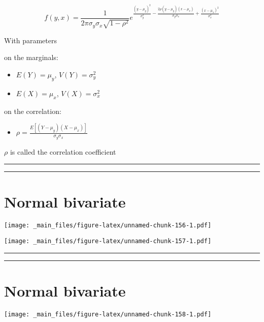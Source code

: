 \documentclass[
]{book}
\providecommand{\tightlist}{%
  \setlength{\itemsep}{0pt}\setlength{\parskip}{0pt}}
\begin{document}
\[f(y,x)=\frac{1}{2\pi \sigma_y\sigma_x \sqrt{1-\rho^2}}e^{\frac{(y-\mu_y)^2}{\sigma_y^2}-\frac{2\rho(y-\mu_y)(x-\mu_x)}{\sigma_y\sigma_x}+\frac{(x-\mu_x)^2}{\sigma_x^2}}\]

With parameters

on the marginals:

\begin{itemize}
\tightlist
\item
  \(E(Y)=\mu_y\), \(V(Y)=\sigma^2_y\)
\item
  \(E(X)=\mu_x\), \(V(X)=\sigma^2_x\)
\end{itemize}

on the correlation:

\begin{itemize}
\tightlist
\item
  \(\rho= \frac{E[(Y-\mu_y)(X-\mu_x)]}{\sigma_y\sigma_x}\)
\end{itemize}

\(\rho\) is called the correlation coefficient

\begin{center}\rule{0.5\linewidth}{0.5pt}\end{center}

\begin{center}\rule{0.5\linewidth}{0.5pt}\end{center}

\hypertarget{normal-bivariate-1}{%
\section{Normal bivariate}\label{normal-bivariate-1}}

\texttt{[image: \_main\_files/figure-latex/unnamed-chunk-156-1.pdf]}

\texttt{[image: \_main\_files/figure-latex/unnamed-chunk-157-1.pdf]}

\begin{center}\rule{0.5\linewidth}{0.5pt}\end{center}

\begin{center}\rule{0.5\linewidth}{0.5pt}\end{center}

\hypertarget{normal-bivariate-2}{%
\section{Normal bivariate}\label{normal-bivariate-2}}

\texttt{[image: \_main\_files/figure-latex/unnamed-chunk-158-1.pdf]}
\end{document}
